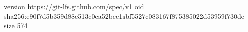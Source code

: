 version https://git-lfs.github.com/spec/v1
oid sha256:e90f7d5b359d88e513c0ea52bec1abf5527c083167f875385022d53959f730de
size 574
